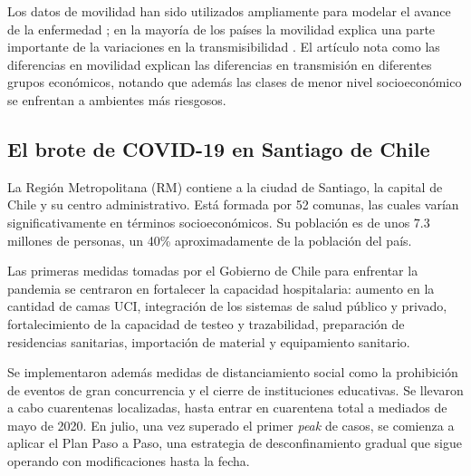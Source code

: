 Los datos de movilidad han sido utilizados ampliamente para modelar el avance de la enfermedad \cite{Lai2020}\cite{Kraemer2020}\cite{Chinazzi2020}; en la mayoría de los países la movilidad explica una parte importante de la variaciones en la transmisibilidad \cite{Nouvellet2021}. El artículo \cite{Chang2021} nota como las diferencias en movilidad explican las diferencias en transmisión en diferentes grupos económicos, notando que además las clases de menor nivel socioeconómico se enfrentan a ambientes más riesgosos.




\subsection{El brote de COVID-19 en Santiago de Chile }

La Región Metropolitana (RM) contiene a la ciudad de Santiago, la capital de Chile y su centro administrativo. Está formada por 52 comunas, las cuales varían significativamente en términos socioeconómicos. Su población es de unos \(7.3\) millones de personas, un 40\% aproximadamente de la población del país.

Las primeras medidas tomadas por el Gobierno de Chile para enfrentar la pandemia se centraron en fortalecer la capacidad hospitalaria: aumento en la cantidad de camas UCI, integración de los sistemas de salud público y privado, fortalecimiento de la capacidad de testeo y trazabilidad, preparación de residencias sanitarias, importación de material y equipamiento sanitario.

Se implementaron además \cite{Tariq2021a} medidas de distanciamiento social como la prohibición de eventos de gran concurrencia y el cierre de instituciones educativas. Se llevaron a cabo cuarentenas localizadas, hasta entrar en cuarentena total a mediados de mayo de 2020. En julio, una vez superado el primer \textit{peak} de casos, se comienza a aplicar el Plan Paso a Paso, una estrategia de desconfinamiento  gradual que sigue operando con modificaciones hasta la fecha.

